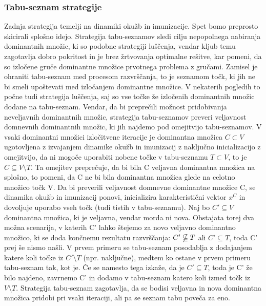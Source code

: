 \documentclass[a4paper]{article}
\begin{document}
\subsubsection{Tabu-seznam strategije} Zadnja strategija temelji na dinamiki okužb in imunizacije. Spet bomo preprosto skicirali splošno idejo. Strategija tabu-seznamov sledi cilju nepopolnega nabiranja dominantnih množic, ki so podobne strategiji luščenja, vendar kljub temu zagotavlja dobro pokritost in je brez žrtvovanja optimalne rešitve, kar pomeni, da so izločene gruče dominantne množice prvotnega problema z gručami. Zamisel je ohraniti tabu-seznam med procesom razvrščanja, to je seznamom točk, ki jih ne bi smeli upoštevati med izločanjem dominantne množice. V nekaterih pogledih to počne tudi strategija luščenja, saj so vse točke že izločenih dominantnih množic dodane na tabu-seznam. Vendar, da bi preprečili možnost pridobivanja neveljavnih dominantnih množic, strategija tabu-seznamov preveri veljavnost domnevnih dominantnih množic, ki jih najdemo pod omejitvijo tabu-seznamov. V vsaki dominantni množici izločitvene iteracije je dominantna množica $C \subset V$ ugotovljena z izvajanjem dinamike okužb in imunizacij z naključno inicializacijo z omejitvijo, da ni mogoče uporabiti nobene točke v tabu-seznamu $T \subset V$, to je $C \subseteq V\setminus T$. Ta omejitev preprečuje, da bi bila C veljavna dominantna množica na splošno, to pomeni, da C ne bi bila dominantna množica glede na celotno množico točk V. Da bi preverili veljavnost domnevne dominantne množice C, se dinamika okužb in imunizacij ponovi, inicializira karakteristični vektor $x^C$ in dovoljuje uporabo vseh točk (tudi tistih v tabu-seznamu). Naj bo $C' \subseteq V$ dominantna množica, ki je veljavna, vendar morda ni nova. Obstajata torej dva možna scenarija, v katerih C' lahko štejemo za novo veljavno dominantno množico, ki se doda končnemu rezultatu razvrščanja: $C' \nsubseteqq T$ ali $C' \subseteq T$, toda C' prej še nismo našli.
V prvem primeru se tabu-seznam posodablja z dodajanjem katere koli točke iz $C'\setminus T$ (npr. naključne), medtem ko ostane v prvem primeru tabu-seznam tak, kot je. Če se namesto tega izkaže, da je $C'\subseteq T$, toda je C' že bilo najdeno, zavrnemo C' in dodamo v tabu-seznam katero koli izmed točk iz $V\setminus T$.
Strategija tabu-seznam zagotavlja, da se bodisi veljavna in nova dominantna množica pridobi pri vsaki iteraciji, ali pa se seznam tabu poveča za eno.
\end{document}
